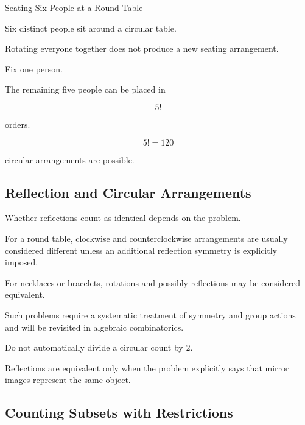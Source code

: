 \begin{workedexamplebox}{Seating Six People at a Round Table}

Six distinct people sit around a circular table.

Rotating everyone together does not produce a new seating arrangement.

Fix one person.

The remaining five people can be placed in

\[
5!
\]

orders.

\begin{answerbox}
\[
\boxed{
5!=120
}
\]

circular arrangements are possible.
\end{answerbox}

\end{workedexamplebox}

\subsection{Reflection and Circular Arrangements}
\label{subsec:reflection-circular-arrangements}

Whether reflections count as identical depends on the problem.

For a round table, clockwise and counterclockwise arrangements are
usually considered different unless an additional reflection symmetry
is explicitly imposed.

For necklaces or bracelets, rotations and possibly reflections may be
considered equivalent.

Such problems require a systematic treatment of symmetry and group
actions and will be revisited in algebraic combinatorics.

\begin{warningbox}
Do not automatically divide a circular count by \(2\).

Reflections are equivalent only when the problem explicitly says that
mirror images represent the same object.
\end{warningbox}

\subsection{Counting Subsets with Restrictions}
\label{subsec:counting-subsets-restrictions}

